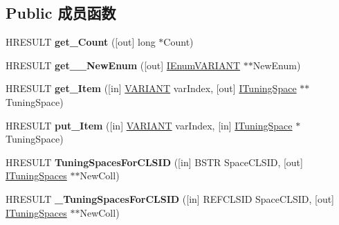 \subsection*{Public 成员函数}
\begin{DoxyCompactItemize}
\item 
\mbox{\label{interface_i_tuning_space_container_a4a2e381a1f8fdb2d56f5da72d3a2a96e}} 
H\+R\+E\+S\+U\+LT {\bfseries get\+\_\+\+Count} (\mbox{[}out\mbox{]} long $\ast$Count)
\item 
\mbox{\label{interface_i_tuning_space_container_a8edf4e0e25b1aa5f05a5d68afa5c094d}} 
H\+R\+E\+S\+U\+LT {\bfseries get\+\_\+\+\_\+\+New\+Enum} (\mbox{[}out\mbox{]} \hyperlink{interface_i_enum_v_a_r_i_a_n_t}{I\+Enum\+V\+A\+R\+I\+A\+NT} $\ast$$\ast$New\+Enum)
\item 
\mbox{\label{interface_i_tuning_space_container_a3b6abc129cbfef1591036ac6135d1213}} 
H\+R\+E\+S\+U\+LT {\bfseries get\+\_\+\+Item} (\mbox{[}in\mbox{]} \hyperlink{structtag_v_a_r_i_a_n_t}{V\+A\+R\+I\+A\+NT} var\+Index, \mbox{[}out\mbox{]} \hyperlink{interface_i_tuning_space}{I\+Tuning\+Space} $\ast$$\ast$Tuning\+Space)
\item 
\mbox{\label{interface_i_tuning_space_container_a782b1ac067cee4e79616c0ca87bb6d45}} 
H\+R\+E\+S\+U\+LT {\bfseries put\+\_\+\+Item} (\mbox{[}in\mbox{]} \hyperlink{structtag_v_a_r_i_a_n_t}{V\+A\+R\+I\+A\+NT} var\+Index, \mbox{[}in\mbox{]} \hyperlink{interface_i_tuning_space}{I\+Tuning\+Space} $\ast$Tuning\+Space)
\item 
\mbox{\label{interface_i_tuning_space_container_aa88a65f17616255c16e861e7919bc67c}} 
H\+R\+E\+S\+U\+LT {\bfseries Tuning\+Spaces\+For\+C\+L\+S\+ID} (\mbox{[}in\mbox{]} B\+S\+TR Space\+C\+L\+S\+ID, \mbox{[}out\mbox{]} \hyperlink{interface_i_tuning_spaces}{I\+Tuning\+Spaces} $\ast$$\ast$New\+Coll)
\item 
\mbox{\label{interface_i_tuning_space_container_aeda6cb53dfbf4ae93608d56332d98397}} 
H\+R\+E\+S\+U\+LT {\bfseries \+\_\+\+Tuning\+Spaces\+For\+C\+L\+S\+ID} (\mbox{[}in\mbox{]} R\+E\+F\+C\+L\+S\+ID Space\+C\+L\+S\+ID, \mbox{[}out\mbox{]} \hyperlink{interface_i_tuning_spaces}{I\+Tuning\+Spaces} $\ast$$\ast$New\+Coll)

\end{DoxyCompactItemize}
